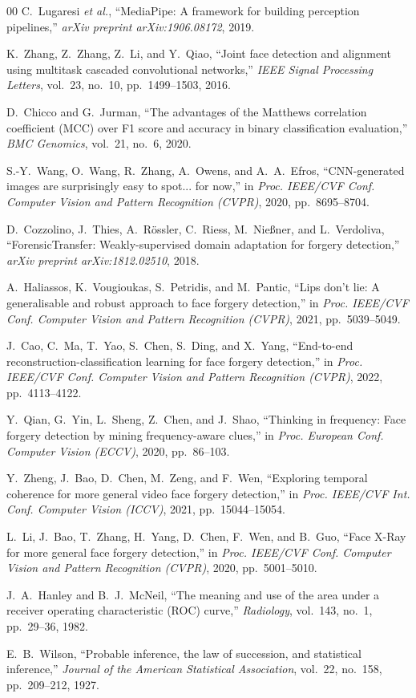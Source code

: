 \documentclass[conference]{IEEEtran}
\begin{document}
\begin{thebibliography}{00}
C.~Lugaresi \emph{et al.}, ``MediaPipe: A framework for building perception
pipelines,'' \emph{arXiv preprint arXiv:1906.08172}, 2019.

K.~Zhang, Z.~Zhang, Z.~Li, and Y.~Qiao, ``Joint face detection and
alignment using multitask cascaded convolutional networks,'' \emph{IEEE
Signal Processing Letters}, vol.~23, no.~10, pp.~1499--1503, 2016.

D.~Chicco and G.~Jurman, ``The advantages of the Matthews correlation
coefficient (MCC) over F1 score and accuracy in binary classification
evaluation,'' \emph{BMC Genomics}, vol.~21, no.~6, 2020.

S.-Y.~Wang, O.~Wang, R.~Zhang, A.~Owens, and A.~A.~Efros, ``CNN-generated
images are surprisingly easy to spot... for now,'' in \emph{Proc. IEEE/CVF
Conf. Computer Vision and Pattern Recognition (CVPR)}, 2020, pp.~8695--8704.

D.~Cozzolino, J.~Thies, A.~R\"{o}ssler, C.~Riess, M.~Nie\ss{}ner, and
L.~Verdoliva, ``ForensicTransfer: Weakly-supervised domain adaptation for
forgery detection,'' \emph{arXiv preprint arXiv:1812.02510}, 2018.

A.~Haliassos, K.~Vougioukas, S.~Petridis, and M.~Pantic, ``Lips don't lie:
A generalisable and robust approach to face forgery detection,'' in
\emph{Proc. IEEE/CVF Conf. Computer Vision and Pattern Recognition (CVPR)},
2021, pp.~5039--5049.

J.~Cao, C.~Ma, T.~Yao, S.~Chen, S.~Ding, and X.~Yang, ``End-to-end
reconstruction-classification learning for face forgery detection,'' in
\emph{Proc. IEEE/CVF Conf. Computer Vision and Pattern Recognition (CVPR)},
2022, pp.~4113--4122.

Y.~Qian, G.~Yin, L.~Sheng, Z.~Chen, and J.~Shao, ``Thinking in frequency:
Face forgery detection by mining frequency-aware clues,'' in \emph{Proc.
European Conf. Computer Vision (ECCV)}, 2020, pp.~86--103.

Y.~Zheng, J.~Bao, D.~Chen, M.~Zeng, and F.~Wen, ``Exploring temporal
coherence for more general video face forgery detection,'' in \emph{Proc.
IEEE/CVF Int. Conf. Computer Vision (ICCV)}, 2021, pp.~15044--15054.

L.~Li, J.~Bao, T.~Zhang, H.~Yang, D.~Chen, F.~Wen, and B.~Guo, ``Face
X-Ray for more general face forgery detection,'' in \emph{Proc. IEEE/CVF
Conf. Computer Vision and Pattern Recognition (CVPR)}, 2020, pp.~5001--5010.

J.~A.~Hanley and B.~J.~McNeil, ``The meaning and use of the area under a
receiver operating characteristic (ROC) curve,'' \emph{Radiology}, vol.~143,
no.~1, pp.~29--36, 1982.

E.~B.~Wilson, ``Probable inference, the law of succession, and statistical
inference,'' \emph{Journal of the American Statistical Association},
vol.~22, no.~158, pp.~209--212, 1927.

\end{thebibliography}
\end{document}
